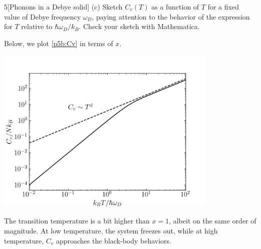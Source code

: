 \documentclass[12pt]{article}
\begin{document}
\begin{problem}{5}[Phonons in a Debye solid]
(c) Sketch $C_v(T)$ as a function of $T$ for a fixed value of Debye frequency
$\omega_D$, paying attention to the behavior of the expression for $T$ relative
to $\hbar\omega_D/k_B$. Check your sketch with Mathematica.
\begin{solution}
Below, we plot \eqref{p5b:Cv} in terms of $x$.
\begin{center}
    \includegraphics[width=0.8\textwidth]{p5.png} 
\end{center}
The transition temperature is a bit higher than $x=1$, albeit on the same order
of magnitude. At low temperature, the system freezes out, while at high
temperature, $C_v$ approaches the black-body behaviors.
\end{solution}
\end{problem}
\newpage
\end{document}
